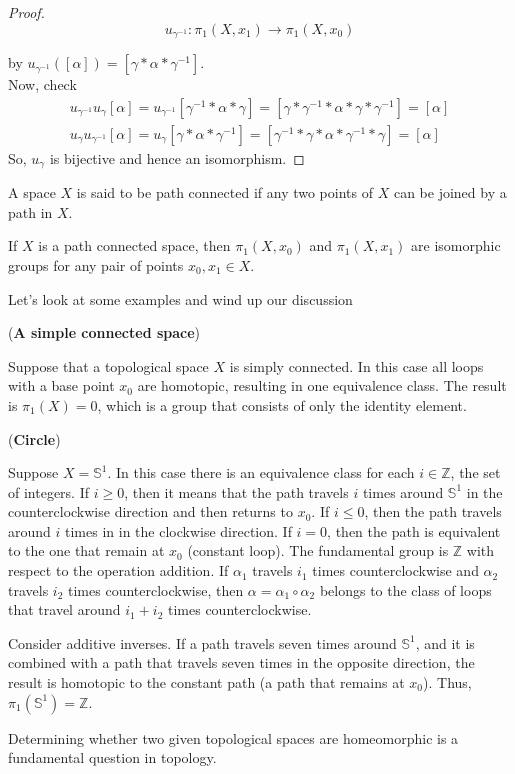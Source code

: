 \begin{proof}
$$u_{\gamma^{-1}}: \pi_1(X,x_1)\rightarrow \pi_1(X,x_0)$$

by $u_{\gamma^{-1}}([\alpha])=[\gamma\ast\alpha\ast\gamma^{-1}]$.\\
Now, check \begin{align*}
u_{\gamma^{-1}}u_\gamma[\alpha]=u_{\gamma^{-1}}[\gamma^{-1}\ast\alpha\ast\gamma]=[\gamma\ast\gamma^{-1}\ast\alpha\ast\gamma\ast\gamma^{-1}]=[\alpha]\\
u_{\gamma}u_{\gamma^{-1}}[\alpha]=u_{\gamma}[\gamma\ast\alpha\ast\gamma^{-1}]=[\gamma^{-1}\ast\gamma\ast\alpha\ast\gamma^{-1}\ast\gamma]=[\alpha]
\end{align*}
So, $u_\gamma$ is bijective and hence an isomorphism.
\end{proof}

\begin{definition}
A space $X$ is said to be path connected if any two points of $X$ can be joined by a path in $X$.
\end{definition}

\begin{cor}
If $X$ is a path connected space, then $\pi_1(X,x_0)$ and $\pi_1(X,x_1)$ are isomorphic groups for any pair of points $x_0,x_1\in X$.
\end{cor}

Let's look at some examples and wind up our discussion

\begin{example}
(\textbf{A simple connected space})

Suppose that a topological space $X$ is simply connected. In this case all loops with a base point $x_0$ are homotopic, resulting in one equivalence class. The result is $\pi_1(X)=0$, which is a group that consists of only the identity element.
\end{example}

\begin{example}
(\textbf{Circle})

Suppose $X=\mathbb{S}^1$. In this case there is an equivalence class for each $i\in \mathbb{Z}$, the set of integers. If $i\ge0$, then it means that the path travels $i$ times around $\mathbb{S}^1$ in the counterclockwise direction and then returns to $x_0$. If $i\le0$, then the path travels around $i$ times in in the clockwise direction. If $i=0$, then the path is equivalent to the one that remain at $x_0$ (constant loop). The fundamental group is $\mathbb{Z}$ with respect to the operation addition. If $\alpha_1$ travels $i_1$ times counterclockwise and $\alpha_2$ travels $i_2$ times counterclockwise, then $\alpha =\alpha_1\circ\alpha_2$ belongs to the class of loops that travel around $i_1+i_2$ times counterclockwise.

Consider additive inverses. If a path travels seven times around $\mathbb{S}^1$, and it is combined with a path that travels seven times in the opposite direction, the result is homotopic to the constant path (a path that remains at $x_0$). Thus, $\pi_1(\mathbb{S}^1)=\mathbb{Z}$.
\end{example}
Determining whether two given topological spaces are homeomorphic is a fundamental question in topology.

